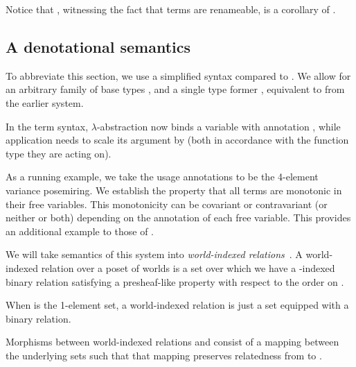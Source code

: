 
Notice that , witnessing the fact
that terms are renameable, is a corollary of .


\subsection{A denotational semantics}

To abbreviate this section, we use a simplified syntax compared to \name{}.
We allow for an arbitrary family of base types , and a single
type former \mbox{}, equivalent to
\mbox{} from the earlier system.


In the term syntax, $\lambda$-abstraction now binds a variable with annotation
, while application needs to scale its argument by 
(both in accordance with the function type they are acting on).


As a running example, we take the usage annotations to be the 4-element
variance posemiring.
We establish the property that all terms are monotonic in their free variables.
This monotonicity can be covariant or contravariant (or neither or both)
depending on the annotation of each free variable.
This provides an additional example to those of \citet{AbelBernardy2020}.

We will take semantics of this system into
\emph{world-indexed relations}~\cite{AbelBernardy2020}.
A world-indexed relation over a poset of worlds  is a set over
which
we have a -indexed binary relation satisfying a presheaf-like
property with respect to the order on .


\begin{example}
  When  is the 1-element set, a world-indexed relation is just a
  set equipped with a binary relation.
\end{example}

Morphisms between world-indexed relations  and 
consist of a mapping between the underlying sets such that that mapping
preserves relatedness from  to .

